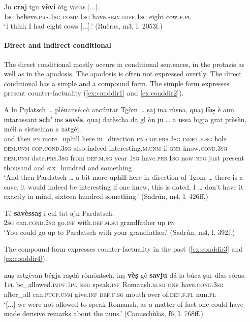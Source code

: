 \ea
\label{ex:subjimpf3}
\gll Ju \textbf{craj} tgu \textbf{vèvi} òtg vacas [...].\\
\textsc{1sg} believe.\textsc{prs.1sg} \textsc{comp.1sg} have.\textsc{sbjv.impf.1sg} eight cow.\textsc{f.pl}\\
\glt `I think I had eight cows [...].' (Ruèras, m3, l. 2053f.)
\z

\paragraph{Direct and indirect conditional}

The direct conditional mostly occurs in conditional sentences, in the protasis as well as in the apodosis. The apodosis is often not expressed overtly. The direct conditional has a simple and a compound form. The simple form expresses present counter-factuality (\ref{ex:conddir1} and \ref{ex:conddir2}).

\ea\label{ex:conddir1}
\gll A lu Pr̩datsch … plénansé cò ancúntar Tgòm … ṣaj ina rùsna, quaj \textbf{fùṣ} è aun intarassant \textbf{sch’} ins \textbf{savés}, quaj datèscha da gl òn ju … a ussa bigja grat prèsèn, méli a sistschian a zatgéj.\\
and then \textsc{pn} {} more\_uphill here in\_direction \textsc{pn} {} \textsc{cop.prs.3sg} \textsc{indef.f.sg} hole \textsc{dem.unm} \textsc{cop.cond.3sg} also indeed interesting.\textsc{m.unm} if \textsc{gnr} know.\textsc{cond.3sg} \textsc{dem.unm} date.\textsc{prs.3sg} from \textsc{def.m.sg} year \textsc{1sg} {} have.\textsc{prs.1sg} now \textsc{neg} just present thousand and six\_hundred and something\\
\glt `And then Pardatsch … a bit more uphill here in direction of Tgom … there is a cave, it would indeed be interesting if one knew, this is dated, I … don't have it exactly in mind, sixteen hundred something.' (Sadrún, m4, l. 426ff.)
\z

\ea
\label{ex:conddir2}
\gll  Té \textbf{savèssaṣ} í cul tat ajn Pardatsch.\\
\textsc{2sg} can.\textsc{cond.2sg} go.\textsc{inf} with.\textsc{def.m.sg} grandfather up \textsc{pn}\\
\glt `You could go up to Pardatsch with your grandfather.' (Sadrún, m4, l. 392f.)
\z

The compound form expresses counter-factuality in the past (\ref{ex:conddir3} and \ref{ex:conddir4}).

\ea
\label{ex:conddir3}
\gll   [...] nuṣ astgèvan bégja raṣdá ròmòntsch, inṣ \textbf{vèṣ} gè \textbf{savju} dá la bùca ṣur dlas sòras.\\
{} \textsc{1pl} be\_allowed.\textsc{impf.1pl} \textsc{neg} speak.\textsc{inf} Romansh.\textsc{m.sg} \textsc{gnr}  have.\textsc{cond.3sg} after\_all can.\textsc{ptcp.unm} give.\textsc{inf} \textsc{def.f.sg} mouth over of.\textsc{def.f.pl} nun.\textsc{pl}\\
\glt `[...] we were not allowed to speak Romansh, as a matter of fact one could have made derisive remarks about the nuns.' (Camischùlas, f6, l. 768ff.)
\z

